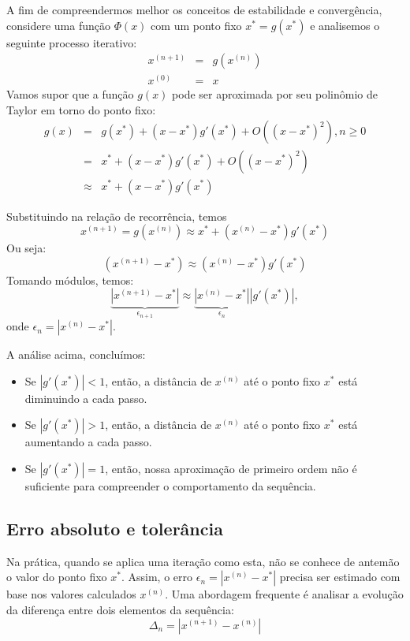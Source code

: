 A fim de compreendermos melhor os conceitos de estabilidade e convergência, considere uma função $\Phi(x)$ com um ponto fixo $x^*=g(x^*)$ e analisemos o seguinte processo iterativo:
\begin{eqnarray*}
x^{(n+1)}&=&g\left(x^{(n)}\right)\\
x^{(0)}&=&x
\end{eqnarray*}
Vamos supor que a função $g(x)$ pode ser aproximada por seu polinômio de Taylor em torno do ponto fixo:
\begin{eqnarray*}
g(x)&=&g(x^*)+(x-x^*) g'(x^*)+O\left((x-x^*)^2\right), n\geq 0\\
&=&x^*+(x-x^*) g'(x^*)+O\left((x-x^*)^2\right)\\
&\approx& x^*+(x-x^*) g'(x^*)
\end{eqnarray*}

Substituindo na relação de recorrência, temos
$$
x^{(n+1)}=g\left(x^{(n)}\right)\approx x^*+(x^{(n)}-x^*) g'(x^*)
$$
Ou seja:
$$
\left(x^{(n+1)}-x^*\right)\approx {(x^{(n)}-x^*)} g'(x^*)
$$
Tomando módulos, temos:
$$
\underbrace{\left|x^{(n+1)}-x^*\right|}_{\epsilon_{n+1}}\approx \underbrace{\left|x^{(n)}-x^*\right|}_{\epsilon_n} \left|g'(x^*)\right|,
$$
onde $\epsilon_n=\left|x^{(n)}-x^*\right|$.

\begin{obs} A análise acima, concluímos:
\begin{itemize}
\item Se $|g'(x^*)|<1$, então, a distância de $x^{(n)}$ até o ponto fixo $x^*$ está diminuindo a cada passo.
\item Se $|g'(x^*)|>1$, então, a distância de $x^{(n)}$ até o ponto fixo $x^*$ está aumentando a cada passo.
\item Se $|g'(x^*)|=1$, então, nossa aproximação de primeiro ordem não é suficiente para compreender o comportamento da sequência.
\end{itemize}
\end{obs}

\subsection{Erro absoluto e tolerância}

Na prática, quando se aplica uma iteração como esta, não se conhece de antemão o valor do ponto fixo $x^*$. Assim, o erro $\epsilon_n=\left|x^{(n)}-x^*\right|$ precisa ser estimado com base nos valores calculados $x^{(n)}$. Uma abordagem frequente é analisar a evolução da diferença entre dois elementos da sequência:
$$\Delta_n=\left|x^{(n+1)}-x^{(n)}\right|$$

